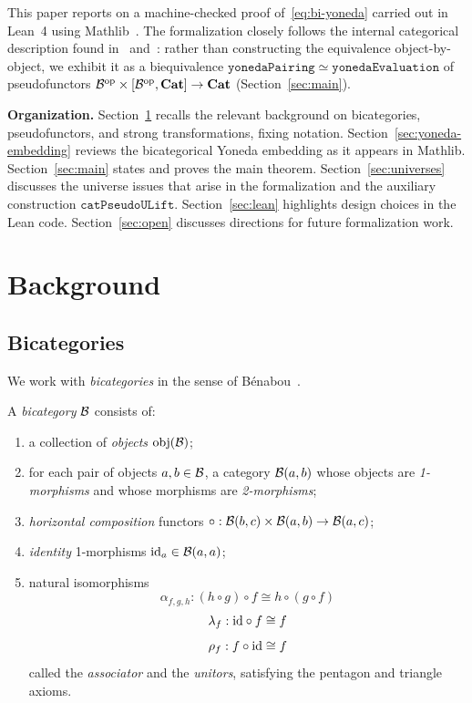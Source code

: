 \documentclass[12pt]{article}
\begin{document}
This paper reports on a machine-checked proof of~\eqref{eq:bi-yoneda} carried out in
Lean~4 using Mathlib~\citep{mathlib4}.  The formalization closely follows the internal
categorical description found in~\citet{johnson-yau2021} and~\citet{leinster2004}:
rather than constructing the equivalence object-by-object, we exhibit it as a
biequivalence $\mathtt{yonedaPairing} \simeq \mathtt{yonedaEvaluation}$ of
pseudofunctors $\mathcal{B}^{\mathrm{op}} \times [\mathcal{B}^{\mathrm{op}}, \mathbf{Cat}] \to \mathbf{Cat}$
(Section~\ref{sec:main}).

\medskip\noindent\textbf{Organization.}
Section~\ref{sec:background} recalls the relevant background on bicategories,
pseudofunctors, and strong transformations, fixing notation.
Section~\ref{sec:yoneda-embedding} reviews the bicategorical Yoneda embedding as it
appears in Mathlib.
Section~\ref{sec:main} states and proves the main theorem.
Section~\ref{sec:universes} discusses the universe issues that arise in the
formalization and the auxiliary construction $\mathtt{catPseudoULift}$.
Section~\ref{sec:lean} highlights design choices in the Lean code.
Section~\ref{sec:open} discusses directions for future formalization work.

\section{Background}\label{sec:background}

\subsection{Bicategories}

We work with \emph{bicategories} in the sense of B{\'e}nabou~\citep{benabou1967}.

\begin{definition}
  A \emph{bicategory} $\mathcal{B}$ consists of:
  \begin{enumerate}[label=(\roman*)]
    \item a collection of \emph{objects} $\mathrm{obj}(\mathcal{B})$;
    \item for each pair of objects $a, b \in \mathcal{B}$, a category $\mathcal{B}(a,b)$ whose objects
          are \emph{1-morphisms} and whose morphisms are \emph{2-morphisms};
    \item \emph{horizontal composition} functors
          $\circ : \mathcal{B}(b,c) \times \mathcal{B}(a,b) \to \mathcal{B}(a,c)$;
    \item \emph{identity} 1-morphisms $\mathrm{id}_a \in \mathcal{B}(a,a)$;
    \item natural isomorphisms
          $$\alpha_{f,g,h} : (h \circ g) \circ f \cong h \circ (g \circ f)$$
          $$\lambda_f : \mathrm{id} \circ f \cong f$$
          $$\rho_f : f \circ \mathrm{id} \cong f$$
          called the  \emph{associator} and the \emph{unitors}, satisfying the pentagon and triangle axioms.
  \end{enumerate}
\end{definition}
\end{document}
